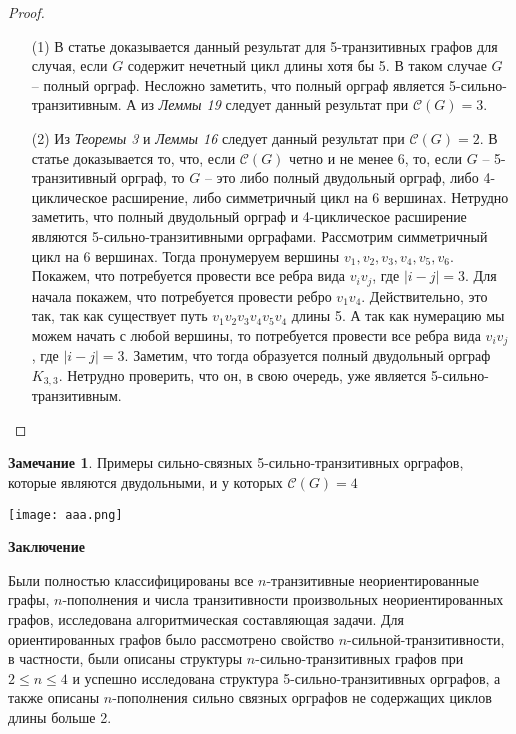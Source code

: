 \documentclass[a4paper,12pt]{article}
\theoremstyle{plain}
\theoremstyle{definition}
\newtheorem{remark}{Замечание}
\begin{document}
		\begin{proof}
	 \begin{enumerate}
\item[(1)] В статье \cite{12} доказывается данный результат для 5-транзитивных графов для случая, если $G$ содержит нечетный цикл длины хотя бы 5. В таком случае $G$ -- полный орграф. Несложно заметить, что полный орграф является 5-сильно-транзитивным. А из \emph{Леммы 19} следует данный результат при $\mathcal{C}(G)=3$.
\item[(2)] Из \emph{Теоремы 3} и \emph{Леммы 16}  следует данный результат при $\mathcal{C}(G)=2$. 
В статье \cite{12} доказывается то, что, если $\mathcal{C}(G)$ четно и не менее 6, то, если $G$ -- 5-транзитивный орграф, то $G$ -- это либо полный двудольный орграф, либо 4-циклическое расширение, либо симметричный цикл на 6 вершинах. Нетрудно заметить, что полный двудольный орграф и 4-циклическое расширение являются 5-сильно-транзитивными орграфами. Рассмотрим симметричный цикл на 6 вершинах. Тогда пронумеруем вершины $v_{1}, v_{2}, v_{3}, v_{4}, v_{5}, v_{6}$. Покажем, что потребуется провести все ребра вида $v_{i}v_{j}$, где $|i-j| = 3$. Для начала покажем, что потребуется провести ребро $v_{1}v_{4}$.  Действительно, это так, так как существует путь $v_{1}v_{2}v_{3}v_{4}v_{5}v_{4}$ длины 5. А так как нумерацию мы можем начать с любой вершины, то потребуется провести все ребра вида $v_{i}v_{j}$, где $|i-j| = 3$. Заметим, что тогда образуется полный двудольный орграф $K_{3,3}$. Нетрудно проверить, что он, в свою очередь, уже является 5-сильно-транзитивным.



\end{enumerate}
	
	\end{proof}
	
	
	\begin{remark}
	Примеры сильно-связных 5-сильно-транзитивных орграфов, которые являются двудольными, и у которых $\mathcal{C}(G)=4$
	\end{remark}
	
	\begin{center}\texttt{[image: aaa.png]}\end{center}
	
	
   
   
   
   \begin{center}
    \textbf{Заключение}
    
    
    Были полностью классифицированы все $n$-транзитивные неориентированные графы, $n$-пополнения и числа транзитивности произвольных неориентированных графов, исследована алгоритмическая составляющая задачи. 
    Для ориентированных графов было рассмотрено свойство $n$-сильной-транзитивности, в частности, были описаны структуры $n$-сильно-транзитивных графов при $ 2 \leq n \leq 4$ и успешно исследована структура 5-сильно-транзитивных орграфов, а также описаны $n$-пополнения сильно связных орграфов не содержащих циклов длины больше 2.
    
    
    
    
\end{center}
\end{document}
